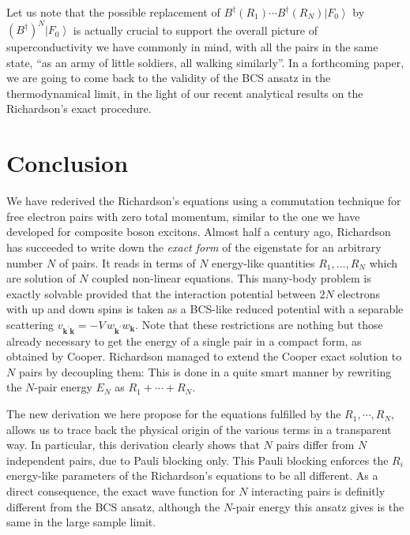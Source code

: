 \documentclass[aps,prb,superscriptaddress,twocolumn]{revtex4}
\newcommand{\vk}{\ensuremath{\mathbf{k}}}
\begin{document}
Let us note that the possible replacement of $B^{\dagger}(R_1)\cdots{}B^{\dagger}(R_N)%
\left|F_0\right>  $ by $\left(B^{\dagger}\right) ^N\left|F_0\right>  $ is
actually crucial to support the overall picture of
superconductivity we have commonly in mind, with all the pairs in the same state, ``as an army of
little soldiers, all walking similarly''. 
In a forthcoming paper, we are going to come back to the validity of the BCS 
ansatz in the thermodynamical limit, in the light of our recent analytical results on the Richardson's exact procedure.

\section{Conclusion}

We have rederived the Richardson's equations using a commutation technique for
free electron pairs with zero total momentum, similar to the one we have
developed for composite boson excitons. Almost half a century ago,
Richardson has succeeded to write down the \emph{exact form} of the eigenstate for an
arbitrary number $N$ of pairs. It reads in terms of $N$ energy-like
quantities $R_1,..., R_N$ which are solution of $N$ coupled non-linear
equations. This many-body problem is exactly solvable provided that the
interaction potential between $2N$ electrons with up and down spins is taken 
as a BCS-like reduced potential with a separable
scattering $v_{\mathbf{k} ^{\prime}\mathbf{k} }=-V\,w_{\mathbf{k}
^{\prime}}w_{\mathbf{k} }$.
Note that these restrictions are nothing but those already necessary to get
the energy of a single pair in a compact form, as obtained by Cooper.
Richardson managed to extend the Cooper exact solution to $N$ pairs by
decoupling them: This is done in a quite smart manner by rewriting the $N$-pair energy $E_N$ as $R_1+\cdots+R_N$.

The new derivation we here propose for the equations fulfilled by the $R_1,\cdots,R_N$, allows us to trace back
the physical origin of the various terms in a transparent way. In
particular, this derivation clearly shows that $N$ pairs differ from $N$ independent
pairs, due to Pauli blocking only. This Pauli blocking
enforces the $R_i$ energy-like parameters of the Richardson's equations to be all different. 
As a direct consequence, the exact wave function for $N$ interacting pairs is 
definitly different from the BCS ansatz, although the $N$-pair energy this ansatz gives is the same in the large sample limit. 
\end{document}

